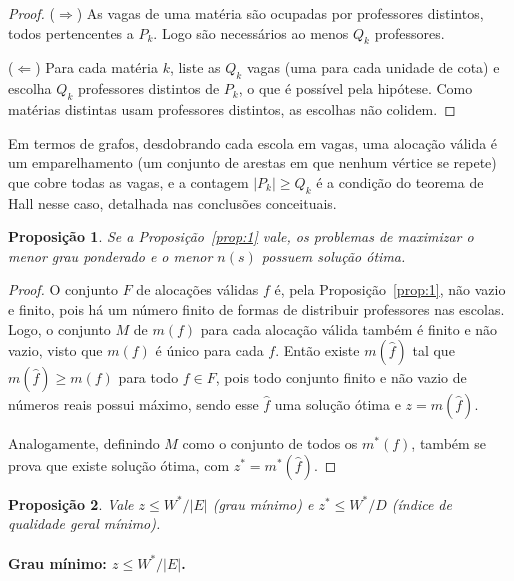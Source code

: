 \documentclass[12pt,a4paper]{article}
\newtheorem{proposicao}{Proposição}
\begin{document}
\begin{proof}
($\Rightarrow$) As vagas de uma matéria são ocupadas por professores distintos, todos pertencentes a $P_k$. Logo são necessários ao menos $Q_k$ professores.

($\Leftarrow$) Para cada matéria $k$, liste as $Q_k$ vagas (uma para cada unidade de cota) e escolha $Q_k$ professores distintos de $P_k$, o que é possível pela hipótese. Como matérias distintas usam professores distintos, as escolhas não colidem.
\end{proof}

Em termos de grafos, desdobrando cada escola em vagas, uma alocação válida é um emparelhamento (um conjunto de arestas em que nenhum vértice se repete) que cobre todas as vagas, e a contagem $|P_k| \ge Q_k$ é a condição do teorema de Hall nesse caso, detalhada nas conclusões conceituais.

\vspace{\baselineskip}

\begin{proposicao}\label{prop:2}
Se a Proposição~\ref{prop:1} vale, os problemas de maximizar o menor grau ponderado e o menor $n(s)$ possuem solução ótima.
\end{proposicao}

\begin{proof}
O conjunto $F$ de alocações válidas $f$ é, pela Proposição~\ref{prop:1}, não vazio e finito, pois há um número finito de formas de distribuir professores nas escolas. Logo, o conjunto $M$ de $m(f)$ para cada alocação válida também é finito e não vazio, visto que $m(f)$ é único para cada $f$. Então existe $m(\hat{f})$ tal que $m(\hat{f}) \ge m(f)$ para todo $f \in F$, pois todo conjunto finito e não vazio de números reais possui máximo, sendo esse $\hat{f}$ uma solução ótima e $z = m(\hat{f})$.

Analogamente, definindo $M$ como o conjunto de todos os $m^*(f)$, também se prova que existe solução ótima, com $z^* = m^*(\hat{f})$.
\end{proof}

\vspace{\baselineskip}

\begin{proposicao}\label{prop:3}
Vale $z \le W^*/|E|$ (grau mínimo) e $z^* \le W^*/D$ (índice de qualidade geral mínimo).
\end{proposicao}

\paragraph{Grau mínimo: $z \le W^*/|E|$.}
\end{document}
